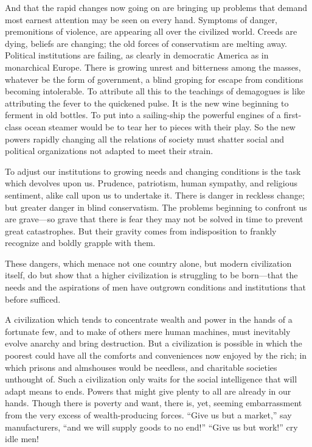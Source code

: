 \documentclass{book}
\begin{document}
And that the rapid changes now going on are bringing up problems that demand most earnest attention may be seen on every hand. Symptoms of danger, premonitions of violence, are appearing all over the civilized world. Creeds are dying, beliefs are changing; the old forces of conservatism are melting away. Political institutions are failing, as clearly in democratic America as in monarchical Europe. There is growing unrest and bitterness among the masses, whatever be the form of government, a blind groping for escape from conditions becoming intolerable. To attribute all this to the teachings of demagogues is like attributing the fever to the quickened pulse. It is the new wine beginning to ferment in old bottles. To put into a sailing-ship the powerful engines of a first-class ocean steamer would be to tear her to pieces with their play. So the new powers rapidly changing all the relations of society must shatter social and political organizations not adapted to meet their strain.

To adjust our institutions to growing needs and changing conditions is the task which devolves upon us. Prudence, patriotism, human sympathy, and religious sentiment, alike call upon us to undertake it. There is danger in reckless change; but greater danger in blind conservatism. The problems beginning to confront us are grave—so grave that there is fear they may not be solved in time to prevent great catastrophes. But their gravity comes from indisposition to frankly recognize and boldly grapple with them.

These dangers, which menace not one country alone, but modern civilization itself, do but show that a higher civilization is struggling to be born—that the needs and the aspirations of men have outgrown conditions and institutions that before sufficed.

A civilization which tends to concentrate wealth and power in the hands of a fortunate few, and to make of others mere human machines, must inevitably evolve anarchy and bring destruction. But a civilization is possible in which the poorest could have all the comforts and conveniences now enjoyed by the rich; in which prisons and almshouses would be needless, and charitable societies unthought of. Such a civilization only waits for the social intelligence that will adapt means to ends. Powers that might give plenty to all are already in our hands. Though there is poverty and want, there is, yet, seeming embarrassment from the very excess of wealth-producing forces. “Give us but a market,” say manufacturers, “and we will supply goods to no end!” “Give us but work!” cry idle men!
\end{document}
